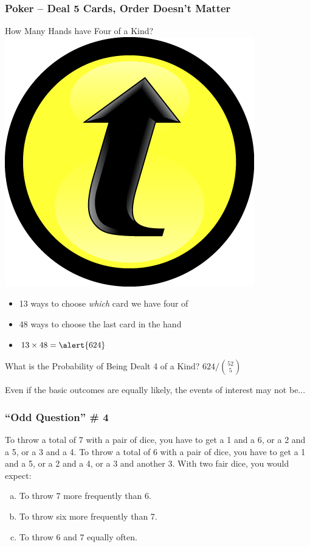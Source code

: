 \documentclass[handout]{beamer}
\begin{document}
\begin{frame}
\frametitle{Poker -- Deal 5 Cards, Order Doesn't Matter}
\begin{block}{How Many Hands have Four of a Kind?\hfill \includegraphics[scale = 0.05]{./images/clicker} }\pause
	\begin{itemize}
		\item 13 ways to choose \emph{which} card we have four of \pause
		\item 48 ways to choose the last card in the hand \pause
		\item $13 \times 48 = \alert{624}$ \pause
	\end{itemize}
\end{block}
\begin{block}{What is the Probability of Being Dealt 4 of a Kind?}
\vspace{0.3em} \pause
$624/\displaystyle{52 \choose 5}$
\end{block}
\vspace{8em}

\end{frame}
\begin{frame}

\centering \Huge Even if the basic outcomes are equally likely, the events of interest may not be...


\end{frame}
\begin{frame}
\frametitle{``Odd Question'' \# 4}
To throw a total of 7 with a pair of dice, you have to get a 1 and a 6, or a 2 and a 5, or a 3 and a 4.
To throw a total of 6 with a pair of dice, you have to get a 1 and a 5, or a 2 and a 4, or a 3 and another 3.
	\vspace{1em}
	With two fair dice, you would expect:
		\begin{enumerate}[(a)]
			\item To throw 7 more frequently than 6.
			\item To throw six more frequently than 7.
			\item To throw 6 and 7 equally often.
		\end{enumerate}
\end{frame}
\end{document}
